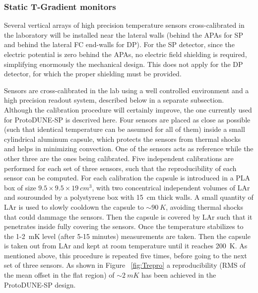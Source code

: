 
\subsubsection{Static T-Gradient monitors}

Several vertical arrays of high precision temperature sensors cross-calibrated in the laboratory will be installed near the lateral walls
(behind the APAs for SP and behind the lateral FC end-walls for DP). 
For the SP detector, since the electric potential is zero behind the APAs, no electric field shielding is required, simplifying enormously the mechanical design.
This does not apply for the DP detector, for which the proper shielding must be provided. 


Sensors are cross-calibrated in the lab using a well controlled environment and a high precision readout system, described below in a separate subsection.
Although the calibration procedure will certainly improve, the one currently used for ProtoDUNE-SP is descrived here.
Four sensors are placed as close as possible (such that identical temperature can be assumed for all of them) inside a small cylindrical aluminum capsule,
which protects the sensors from thermal shocks and helps in minimizing convection.
One of the sensors acts as reference while the other three are the ones being calibrated. Five independent calibrations
are performed for each set of three sensors, such that the reproducibility of each sensor can be computed. For each calibration 
the capsule is introduced in a PLA box of size \(9.5\times9.5\times\SI{19}{cm^3}\), with two concentrical independent volumes of LAr
and sourounded by a polystyrene box with \SI{15}{cm} thick walls. A small quantity of LAr is used to slowly cooldown the capsule to $\sim\SI{90}{K}$, avoiding thermal shocks that could dammage the sensors.
Then the capsule is covered by LAr such that it penetrates
inside fully covering the sensors. Once the temperature stabilizes to the 1-\SI{2}{mK} level (after 5-15 minutes) measurements are taken. Then the capsule is taken out from LAr
and kept at room temperature until it reaches \SI{200}{K}. As mentioned above, this procedure is repeated five times, before going to the next set of three sensors.  
As shown in Figure ~\ref{fig:Trepro} a reproducibility (RMS of the mean offset in the flat region) of $\sim \SI{2}{mK}$ has been achieved in the ProtoDUNE-SP design.  


